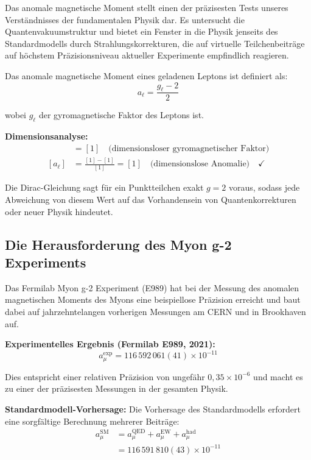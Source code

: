 \documentclass[12pt,a4paper]{report}
\begin{document}
	Das anomale magnetische Moment stellt einen der präzisesten Tests unseres Verständnisses der fundamentalen Physik dar. Es untersucht die Quantenvakuumstruktur und bietet ein Fenster in die Physik jenseits des Standardmodells durch Strahlungskorrekturen, die auf virtuelle Teilchenbeiträge auf höchstem Präzisionsniveau aktueller Experimente empfindlich reagieren.
	
	Das anomale magnetische Moment eines geladenen Leptons ist definiert als:
	\begin{equation}
		a_\ell = \frac{g_\ell - 2}{2}
		\label{eq:anomalous_moment_definition}
	\end{equation}
	
	wobei $g_\ell$ der gyromagnetische Faktor des Leptons ist.
	
	\textbf{Dimensionsanalyse:}
	\begin{align}
		[g_\ell] &= [1] \quad \text{(dimensionsloser gyromagnetischer Faktor)} \\
		[a_\ell] &= \frac{[1] - [1]}{[1]} = [1] \quad \text{(dimensionslose Anomalie)} \quad \checkmark
	\end{align}
	
	Die Dirac-Gleichung sagt für ein Punktteilchen exakt $g = 2$ voraus, sodass jede Abweichung von diesem Wert auf das Vorhandensein von Quantenkorrekturen oder neuer Physik hindeutet.
	
	\subsection{Die Herausforderung des Myon g-2 Experiments}
	\label{subsec:muon_g2_challenge}
	
	Das Fermilab Myon g-2 Experiment (E989) hat bei der Messung des anomalen magnetischen Moments des Myons eine beispiellose Präzision erreicht und baut dabei auf jahrzehntelangen vorherigen Messungen am CERN und in Brookhaven auf.
	
	\textbf{Experimentelles Ergebnis (Fermilab E989, 2021):}
	\begin{equation}
		a_\mu^{\text{exp}} = 116\,592\,061(41) \times 10^{-11}
		\label{eq:muon_experimental}
	\end{equation}
	
	Dies entspricht einer relativen Präzision von ungefähr $0,35 \times 10^{-6}$ und macht es zu einer der präzisesten Messungen in der gesamten Physik.
	
	\textbf{Standardmodell-Vorhersage:}
	Die Vorhersage des Standardmodells erfordert eine sorgfältige Berechnung mehrerer Beiträge:
	\begin{align}
		a_\mu^{\text{SM}} &= a_\mu^{\text{QED}} + a_\mu^{\text{EW}} + a_\mu^{\text{had}} \\
		&= 116\,591\,810(43) \times 10^{-11}
	\end{align}
	
\end{document}
